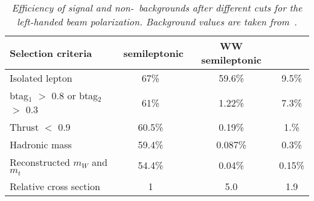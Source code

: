         \begin{table}
        \begin{center}
        \begin{tabular}{l c c c}
        \hline
	Selection criteria & \ttbar\ semileptonic  & WW semileptonic &  \bbbar  \\
	\hline
	Isolated lepton 						& 67\% & 59.6\% & 9.5\% \\
	btag$_1$ $>$ 0.8 or btag$_2$ $>$ 0.3 	& 61\% & 1.22\% & 7.3\% \\
	Thrust $<$ 0.9 							& 60.5\% & 0.19\% & 1.\% \\
	Hadronic mass 							& 59.4\% & 0.087\% & 0.3\% \\
	Reconstructed $m_W$ and $m_t$ 			& 54.4\% & 0.04\% & 0.15\% \\
		\hline
	Relative cross section 					& 1 & 5.0 & 1.9 \\
        \hline
        \end{tabular}
        \end{center}
        \caption{\sl Efficiency of signal and non-\ttbar\ backgrounds after different cuts for the left-handed beam polarization. Background values are taken from~\cite{bib:Jeremy}.}
        \label{table:ttbarselection}
        \end{table}
